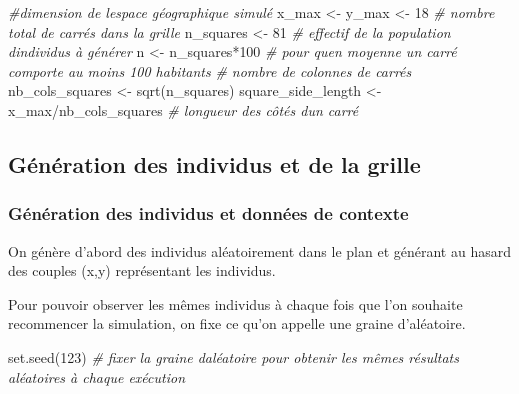 \documentclass[
]{article}
\newenvironment{Shaded}{\begin{snugshade}}{\end{snugshade}}
\newcommand{\CommentTok}[1]{\textcolor[rgb]{0.56,0.35,0.01}{\textit{#1}}}
\newcommand{\DecValTok}[1]{\textcolor[rgb]{0.00,0.00,0.81}{#1}}
\newcommand{\FunctionTok}[1]{\textcolor[rgb]{0.00,0.00,0.00}{#1}}
\newcommand{\NormalTok}[1]{#1}
\newcommand{\OtherTok}[1]{\textcolor[rgb]{0.56,0.35,0.01}{#1}}
\newcommand{\SpecialCharTok}[1]{\textcolor[rgb]{0.00,0.00,0.00}{#1}}
\begin{document}
\begin{Shaded}
\begin{Highlighting}[]
\CommentTok{\#dimension de l\textquotesingle{}espace géographique simulé}
\NormalTok{x\_max }\OtherTok{\textless{}{-}}\NormalTok{ y\_max }\OtherTok{\textless{}{-}} \DecValTok{18}
\CommentTok{\# nombre total de carrés dans la grille}
\NormalTok{n\_squares }\OtherTok{\textless{}{-}} \DecValTok{81}
\CommentTok{\# effectif de la population d\textquotesingle{}individus à générer}
\NormalTok{n }\OtherTok{\textless{}{-}}\NormalTok{ n\_squares}\SpecialCharTok{*}\DecValTok{100} \CommentTok{\# pour qu\textquotesingle{}en moyenne un carré comporte au moins 100 habitants}
\CommentTok{\# nombre de colonnes de carrés}
\NormalTok{nb\_cols\_squares }\OtherTok{\textless{}{-}} \FunctionTok{sqrt}\NormalTok{(n\_squares) }
\NormalTok{square\_side\_length }\OtherTok{\textless{}{-}}\NormalTok{ x\_max}\SpecialCharTok{/}\NormalTok{nb\_cols\_squares }\CommentTok{\# longueur des côtés d\textquotesingle{}un carré}
\end{Highlighting}
\end{Shaded}

\hypertarget{guxe9nuxe9ration-des-individus-et-de-la-grille}{%
\subsection{Génération des individus et de la
grille}\label{guxe9nuxe9ration-des-individus-et-de-la-grille}}

\hypertarget{guxe9nuxe9ration-des-individus-et-donnuxe9es-de-contexte}{%
\subsubsection{Génération des individus et données de
contexte}\label{guxe9nuxe9ration-des-individus-et-donnuxe9es-de-contexte}}

On génère d'abord des individus aléatoirement dans le plan et générant
au hasard des couples (x,y) représentant les individus.

Pour pouvoir observer les mêmes individus à chaque fois que l'on
souhaite recommencer la simulation, on fixe ce qu'on appelle une graine
d'aléatoire.

\begin{Shaded}
\begin{Highlighting}[]
\FunctionTok{set.seed}\NormalTok{(}\DecValTok{123}\NormalTok{) }\CommentTok{\# fixer la graine d\textquotesingle{}aléatoire pour obtenir les mêmes résultats aléatoires à chaque exécution}
\end{Highlighting}
\end{Shaded}
\end{document}
